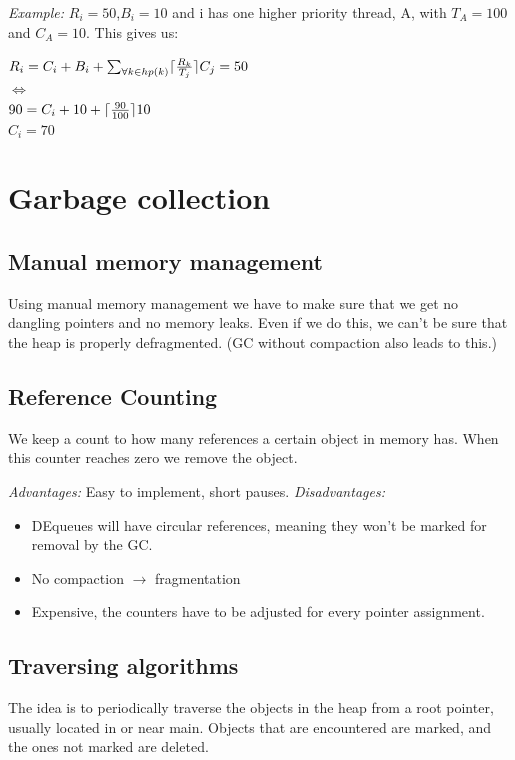 \documentclass[a4paper]{article}
\DeclarePairedDelimiter{\ceil}{\lceil}{\rceil}
\begin{document}
\emph{Example:} $R_i = 50$,$B_i = 10$ and i has one higher priority thread,
A, with $T_A = 100$ and $C_A = 10$. This gives us:
\begin{center}
  $R_i = C_i + B_i + \sum_{\forall k \in hp(k)} \ceil{\frac{R_k}{T_j}} C_j = 50$ \\
  $\Longleftrightarrow$ \\
  $90 = C_i + 10 + \ceil{\frac{90}{100}} 10$ \\
  $C_i = 70$
\end{center}

\section{Garbage collection}

\subsection{Manual memory management}
Using manual memory management we have to make sure that we get no dangling
pointers and no memory leaks. Even if we do this, we can't be sure that the
heap is properly defragmented. (GC without compaction also leads to this.)

\subsection{Reference Counting}
We keep a count to how many references a certain object in memory has. When
this counter reaches zero we remove the object.

\emph{Advantages:} Easy to implement, short pauses.
\emph{Disadvantages:} 
\begin{itemize}
  \item DEqueues will have circular references, meaning they won't
        be marked for removal by the GC.
  \item No compaction $\rightarrow$ fragmentation
  \item Expensive, the counters have to be adjusted for every pointer
        assignment.
\end{itemize}
\subsection{Traversing algorithms}
The idea is to periodically traverse the objects in the heap from a root
pointer, usually located in or near main. Objects that are encountered
are marked, and the ones not marked are deleted.
\end{document}
